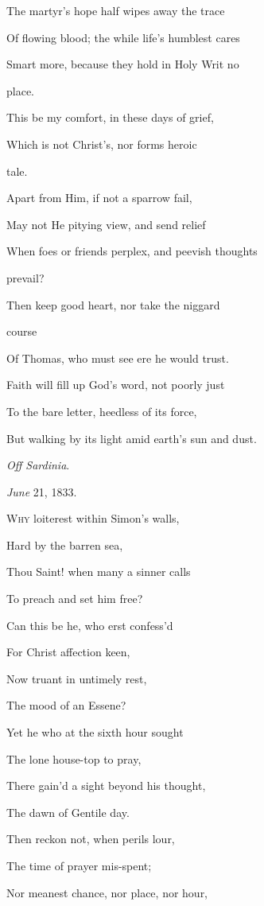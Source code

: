 The martyr's hope half wipes
away the trace

Of flowing blood; the while life's humblest
cares

Smart more, because they hold in Holy Writ no

place.

This be my comfort, in these days of grief,

Which is not Christ's,
nor forms heroic

tale.

Apart from Him, if
not a sparrow fail,

May not He pitying view, and send relief

When foes or friends perplex, and peevish thoughts

prevail? 

Then keep good heart, nor take the niggard

course

Of Thomas, who must see ere
he would trust.

Faith will fill up God's
word, not poorly just

To the bare letter, heedless of its force,

But walking by its light amid earth's sun and dust.

\emph{Off Sardinia}.

\emph{June} 21, 1833.


W\textsc{hy} loiterest within Simon's walls,

Hard by the barren sea,

Thou Saint! when many a sinner calls

To preach and set him free?

Can this be he, who erst confess'd

For Christ affection keen,

Now truant in untimely rest,

The mood of an Essene?

Yet he who at the sixth hour sought

The lone house-top to pray,

There gain'd a sight beyond his thought,

The dawn of Gentile day. 

Then reckon not, when perils lour,

The time of prayer mis-spent;

Nor meanest chance, nor place, nor hour,

